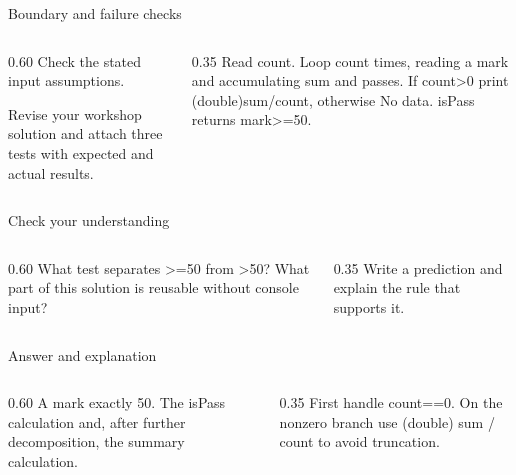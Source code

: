 \documentclass[10pt,aspectratio=169]{beamer}
\begin{document}
\begin{frame}[fragile,t]{Boundary and failure checks}
\begin{columns}[T,onlytextwidth]\begin{column}{0.60\textwidth}
Check the stated input assumptions.

Revise your workshop solution and attach three tests with expected and actual results.
\end{column}\begin{column}{0.35\textwidth}\small
Read count. Loop count times, reading a mark and accumulating sum and passes. If count\textgreater{}0 print (double)sum/count, otherwise No data. isPass returns mark\textgreater{}=50.
\end{column}\end{columns}
\end{frame}

\begin{frame}[fragile,t]{Check your understanding}
\begin{columns}[T,onlytextwidth]\begin{column}{0.60\textwidth}
What test separates \textgreater{}=50 from \textgreater{}50? What part of this solution is reusable without console input?
\end{column}\begin{column}{0.35\textwidth}\small
Write a prediction and explain the rule that supports it.
\end{column}\end{columns}
\end{frame}

\begin{frame}[fragile,t]{Answer and explanation}
\begin{columns}[T,onlytextwidth]\begin{column}{0.60\textwidth}
A mark exactly 50. The isPass calculation and, after further decomposition, the summary calculation.
\end{column}\begin{column}{0.35\textwidth}\small
First handle count==0. On the nonzero branch use (double) sum / count to avoid truncation.
\end{column}\end{columns}
\end{frame}
\end{document}
